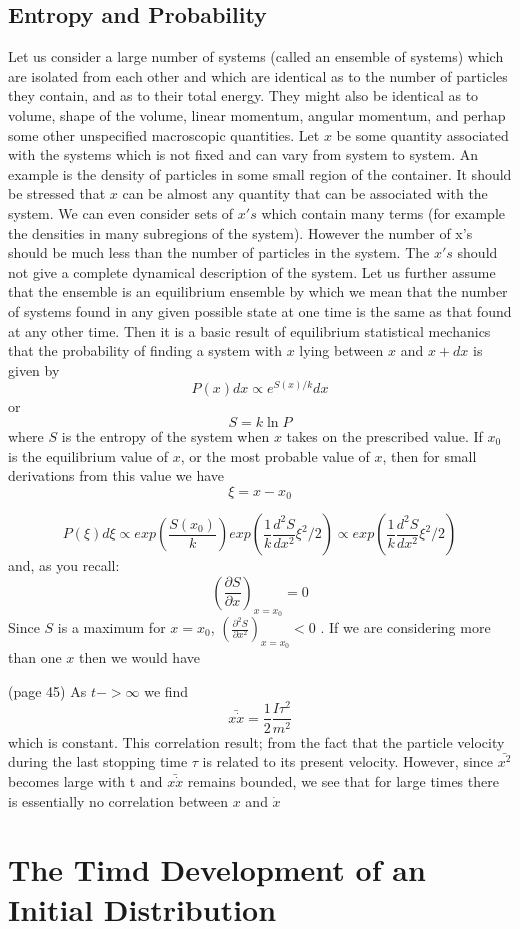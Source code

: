 \documentclass[aps,prl,preprint,showpacs]{revtex4}
\def\beq{\begin{equation}}
\def\eeq{\end{equation}}
\begin{document}
\subsection{Entropy and Probability}
Let us consider a large number of systems
(called an ensemble of systems) which are isolated
from each other and which are identical as to the number of
particles they contain, and as to their total energy.  They
might also be identical as to volume, shape of the volume, linear
momentum, angular momentum, and perhap some other unspecified macroscopic
quantities.  Let $x$ be some quantity associated with the 
systems which is not fixed and can vary from system to system.  An
example is the density of particles in some small region of the
container.  It should be stressed that $x$ can be almost 
any quantity that can be associated with the system.  We can even
consider sets of $x's$ which contain many 
terms (for example the densities in many subregions of the system).
However the number of x's should be much less than the number of particles
in the system.  The $x's$ should not give a complete
dynamical description of the system.  Let us further assume that the
ensemble is an equilibrium ensemble by which we mean that the number 
of systems found in any given possible state at one time is
the same as that found at any other time.  Then it is a basic result of
equilibrium statistical mechanics that the probability of finding a system 
with $x$ lying between $x$ and $x+dx$ is given by 
\beq
P(x) dx \propto e^{S(x)/k} dx
\eeq
or
\beq
S=k \ln P
\eeq
where $S$ is the entropy of the system when $x$ takes on the 
prescribed value.  If $x_0$ is the equilibrium value of $x$, or 
the most probable value of $x$, then for small 
derivations from this value we have
\beq
\xi = x - x_0
\eeq

\beq
P(\xi) d \xi \propto exp(\frac{S(x_0)}{k}) 
exp\left( \frac{1}{k} \frac{d^2 S}{dx^2} \xi^2/2 \right) \propto
exp\left( \frac{1}{k} \frac{d^2 S}{dx^2} \xi^2/2 \right)
\eeq
and, as you recall:
\beq
\left(\frac{\partial S}{\partial x} \right)_{x=x_0} = 0
\eeq
Since $S$ is a maximum for $x = x_0$, 
$\left(\frac{\partial^2 S}{\partial x^2} \right)_{x=x_0} < 0$
.  If we are considering more
than one $x$ then we would have


(page 45)
As $t -> \infty$ we find
\beq
\bar{x \dot{x}} = \frac{1}{2} \frac{I \tau^2}{m^2}
\label{181}
\eeq
which is constant.  This correlation result; from the fact that the particle
velocity during the last stopping time $\tau$ is related to its
present velocity.  However, since $\bar{x^2}$ becomes large with t
and $\bar{x \dot{x}}$ remains bounded, we see that for large
times there is essentially no correlation between $x$ and $\dot{x}$

\section{The Timd Development of an Initial Distribution}
\end{document}
